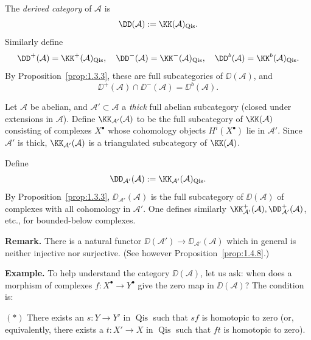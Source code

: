 \begin{definition*}
The \emph{derived category} of $\mathcal{A}$ is
\[
\DD(\mathcal{A}) := \KK(\mathcal{A})_{\operatorname{Qis}}.
\]
Similarly define
\[
\DD^+(\mathcal{A})=\KK^+(\mathcal{A})_{\operatorname{Qis}},\quad
\DD^-(\mathcal{A})=\KK^-(\mathcal{A})_{\operatorname{Qis}},\quad
\DD^b(\mathcal{A})=\KK^b(\mathcal{A})_{\operatorname{Qis}}.
\]
By Proposition~\ref{prop:1.3.3}, these are full subcategories of $\DD(\mathcal{A})$, and
\[
\DD^+(\mathcal{A})\cap \DD^-(\mathcal{A}) = \DD^b(\mathcal{A}).
\]
\end{definition*}

\begin{definition*}
Let $\mathcal{A}$ be abelian, and $\mathcal{A}'\subset\mathcal{A}$ a \emph{thick} full abelian subcategory (closed under extensions in $\mathcal{A}$). Define $\KK_{\mathcal{A}'}(\mathcal{A})$ to be the full subcategory of $\KK(\mathcal{A})$ consisting of complexes $X^\bullet$ whose cohomology objects $H^i(X^\bullet)$ lie in $\mathcal{A}'$. Since $\mathcal{A}'$ is thick, $\KK_{\mathcal{A}'}(\mathcal{A})$ is a triangulated subcategory of $\KK(\mathcal{A})$.

Define
\[
\DD_{\mathcal{A}'}(\mathcal{A}) := \KK_{\mathcal{A}'}(\mathcal{A})_{\operatorname{Qis}}.
\]
By Proposition~\ref{prop:1.3.3}, $\DD_{\mathcal{A}'}(\mathcal{A})$ is the full subcategory of $\DD(\mathcal{A})$ of complexes with all cohomology in $\mathcal{A}'$. One defines similarly $\KK_{\mathcal{A}'}^+(\mathcal{A}), \DD_{\mathcal{A}'}^+(\mathcal{A})$, etc., for bounded-below complexes.
\end{definition*}

\noindent\textbf{Remark.} There is a natural functor
$\DD(\mathcal{A}')\to\DD_{\mathcal{A}'}(\mathcal{A})$ which in general is neither injective nor surjective. (See however Proposition~\ref{prop:1.4.8}.)

\textbf{Example.} To help understand the category $\DD(\mathcal{A})$, let us ask: when does a morphism of complexes $f\colon X^\bullet\to Y^\bullet$ give the zero map in $\DD(\mathcal{A})$? The condition is:

$(*)$ There exists an $s\colon Y\to Y'$ in $\operatorname{Qis}$ such that $sf$ is homotopic to zero (or, equivalently, there exists a $t\colon X'\to X$ in $\operatorname{Qis}$ such that $ft$ is homotopic to zero).

